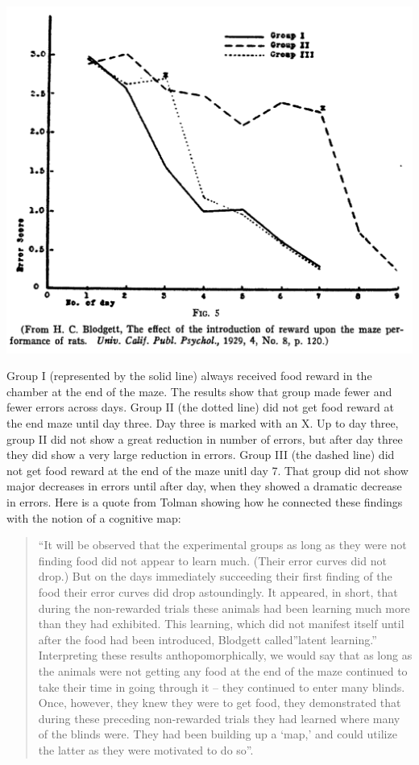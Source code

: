 \documentclass[
  oneside,
  12pt]{crumpbook}
\newenvironment{floatrightbox50}{%
  \wrapfigure{R}{.5\textwidth}%
  }{%
  \endwrapfigure}
\begin{document}
\begin{floatrightbox50}
\includegraphics[width=1\linewidth]{imgs/Tolman_latentresults}

\end{floatrightbox50}

Group I (represented by the solid line) always received food reward in the chamber at the end of the maze. The results show that group made fewer and fewer errors across days. Group II (the dotted line) did not get food reward at the end maze until day three. Day three is marked with an X. Up to day three, group II did not show a great reduction in number of errors, but after day three they did show a very large reduction in errors. Group III (the dashed line) did not get food reward at the end of the maze unitl day 7. That group did not show major decreases in errors until after day, when they showed a dramatic decrease in errors. Here is a quote from Tolman showing how he connected these findings with the notion of a cognitive map:

\begin{quote}
``It will be observed that the experimental groups as long as they were not finding food did not appear to learn much. (Their error curves did not drop.) But on the days immediately succeeding their first finding of the food their error curves did drop astoundingly. It appeared, in short, that during the non-rewarded trials these animals had been learning much more than they had exhibited. This learning, which did not manifest itself until after the food had been introduced, Blodgett called''latent learning.'' Interpreting these results anthopomorphically, we would say that as long as the animals were not getting any food at the end of the maze continued to take their time in going through it -- they continued to enter many blinds. Once, however, they knew they were to get food, they demonstrated that during these preceding non-rewarded trials they had learned where many of the blinds were. They had been building up a `map,' and could utilize the latter as they were motivated to do so''.
\end{quote}
\end{document}

